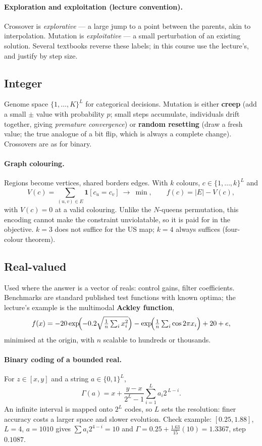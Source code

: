 \documentclass[11pt,a4paper]{article}
\begin{document}
\paragraph{Exploration and exploitation (lecture convention).} Crossover is
\emph{explorative} --- a large jump to a point between the parents, akin to
interpolation. Mutation is \emph{exploitative} --- a small perturbation of an
existing solution. Several textbooks reverse these labels; in this course use
the lecture's, and justify by step size.

\subsection{Integer}

Genome space $\{1,\ldots,K\}^L$ for categorical decisions. Mutation is either
\textbf{creep} (add a small $\pm$ value with probability $p$; small steps
accumulate, individuals drift together, giving \emph{premature convergence})
or \textbf{random resetting} (draw a fresh value; the true analogue of a bit
flip, which is always a complete change). Crossovers are as for binary.

\paragraph{Graph colouring.} Regions become vertices, shared borders edges.
With $k$ colours, $c\in\{1,\ldots,k\}^L$ and
\[
  V(c)=\sum_{(u,v)\in E}\mathbf 1[c_u=c_v]\ \to\ \min,
  \qquad f(c)=|E|-V(c),
\]
with $V(c)=0$ at a valid colouring. Unlike the $N$-queens permutation, this
encoding cannot make the constraint unviolatable, so it is paid for in the
objective. $k=3$ does not suffice for the US map; $k=4$ always suffices
(four-colour theorem).

\subsection{Real-valued}

Used where the answer is a vector of reals: control gains, filter
coefficients. Benchmarks are standard published test functions with known
optima; the lecture's example is the multimodal \textbf{Ackley function},
\[
  f(x)=-20\exp\!\Bigl(-0.2\sqrt{\tfrac1n\textstyle\sum_i x_i^2}\Bigr)
       -\exp\!\Bigl(\tfrac1n\textstyle\sum_i\cos 2\pi x_i\Bigr)+20+e,
\]
minimised at the origin, with $n$ scalable to hundreds or thousands.

\paragraph{Binary coding of a bounded real.} For $z\in[x,y]$ and a string
$a\in\{0,1\}^L$,
\[
  \Gamma(a)=x+\frac{y-x}{2^{L}-1}\sum_{i=1}^{L}a_i2^{\,L-i}.
\]
An infinite interval is mapped onto $2^L$ codes, so $L$ sets the resolution:
finer accuracy costs a larger space and slower evolution. Check example:
$[0.25,1.88]$, $L=4$, $a=1010$ gives $\sum a_i2^{4-i}=10$ and
$\Gamma=0.25+\tfrac{1.63}{15}(10)=1.3367$, step $0.1087$.
\end{document}

